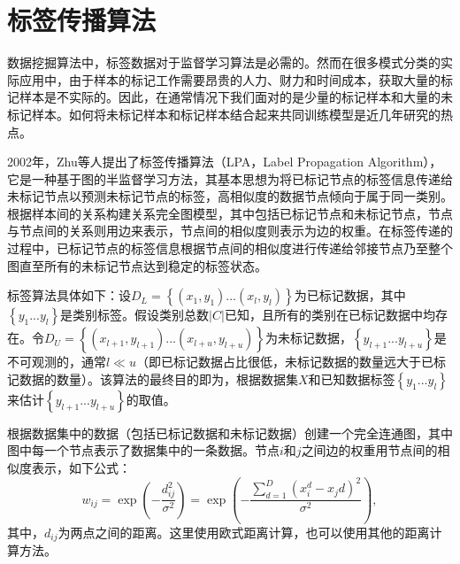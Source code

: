 \section{标签传播算法}
\label{sec:lp}
数据挖掘算法中，标签数据对于监督学习算法是必需的。然而在很多模式分类的实际应用中，由于样本的标记工作需要昂贵的人力、财力和时间成本，获取大量的标记样本是不实际的。因此，在通常情况下我们面对的是少量的标记样本和大量的未标记样本。如何将未标记样本和标记样本结合起来共同训练模型是近几年研究的热点。

2002年，Zhu等人提出了标签传播算法（LPA，Label Propagation Algorithm）\cite{zhu2002learning}，它是一种基于图的半监督学习方法，其基本思想为将已标记节点的标签信息传递给未标记节点以预测未标记节点的标签，高相似度的数据节点倾向于属于同一类别。根据样本间的关系构建关系完全图模型，其中包括已标记节点和未标记节点，节点与节点间的关系则用边来表示，节点间的相似度则表示为边的权重。在标签传递的过程中，已标记节点的标签信息根据节点间的相似度进行传递给邻接节点乃至整个图直至所有的未标记节点达到稳定的标签状态。

标签算法具体如下：设$D_{L}=\left \{ (x_{1},y_{1})...(x_{l},y_{l}) \right \}$为已标记数据，其中$\left \{ y_{1}...y_{l} \right \}$是类别标签。假设类别总数$\left | C \right | $已知，且所有的类别在已标记数据中均存在。令$D_{U}=\left \{ (x_{l+1},y_{l+1})...(x_{l+u},y_{l+u}) \right \}$为未标记数据，$\left \{ y_{l+1}...y_{l+u} \right \}$是不可观测的，通常$l\ll u$（即已标记数据占比很低，未标记数据的数量远大于已标记数据的数量）。该算法的最终目的即为，根据数据集$X$和已知数据标签$\left \{ y_{1}...y_{l} \right \}$来估计$\left \{ y_{l+1}...y_{l+u} \right \}$的取值。

根据数据集中的数据（包括已标记数据和未标记数据）创建一个完全连通图，其中图中每一个节点表示了数据集中的一条数据。节点$i$和$j$之间边的权重用节点间的相似度表示，如下公式：
\begin{equation}
\label{eq:lp_distance}
w_{ij}=\exp\left ( -\frac{d_{ij}^{2}}{{\sigma}^{2}} \right )=\exp\left ( -\frac{{\sum}_{d=1}^{D} {(x_{i}^{d}-x_{j}{d})}^2}{{\sigma}^{2}} \right ),
\end{equation}
其中，$d_{ij}$为两点之间的距离。这里使用欧式距离计算，也可以使用其他的距离计算方法。

